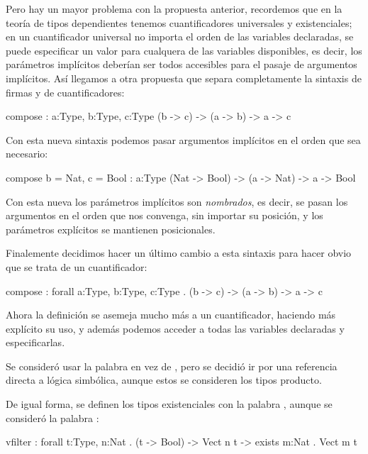 {\begin{designfr}
Pero hay un mayor problema con la propuesta anterior, recordemos que en la teoría de tipos dependientes tenemos cuantificadores universales y existenciales; en un cuantificador universal no importa el orden de las variables declaradas, se puede especificar un valor para cualquera de las variables disponibles, es decir, los parámetros implícitos deberían ser todos accesibles para el pasaje de argumentos implícitos. Así llegamos a otra propuesta que separa completamente la sintaxis de firmas y de cuantificadores:

\begin{anglercode}
compose : { a:Type, b:Type, c:Type } (b -> c) -> (a -> b) -> a -> c
\end{anglercode}

Con esta nueva sintaxis podemos pasar argumentos implícitos en el orden que sea necesario:

\begin{anglercode}
compose { b = Nat, c = Bool } : { a:Type } (Nat -> Bool) -> (a -> Nat) -> a -> Bool
\end{anglercode}

Con esta nueva los parámetros implícitos son \emph{nombrados}, es decir, se pasan los argumentos en el orden que nos convenga, sin importar su posición, y los parámetros explícitos se mantienen posicionales.

Finalemente decidimos hacer un último cambio a esta sintaxis para hacer obvio que se trata de un cuantificador:

\begin{anglercode}
compose : forall a:Type, b:Type, c:Type . (b -> c) -> (a -> b) -> a -> c
\end{anglercode}

Ahora la definición se asemeja mucho más a un cuantificador, haciendo más explícito su uso, y además podemos acceder a todas las variables declaradas y especificarlas.

Se consideró usar la palabra  en vez de , pero se decidió ir por una referencia directa a lógica simbólica, aunque estos se consideren los tipos producto.

De igual forma, se definen los tipos existenciales con la palabra , aunque se consideró la palabra :

\begin{anglercode}
vfilter : forall t:Type, n:Nat . (t -> Bool) -> Vect n t -> exists m:Nat . Vect m t
\end{anglercode}


\end{designfr}}

